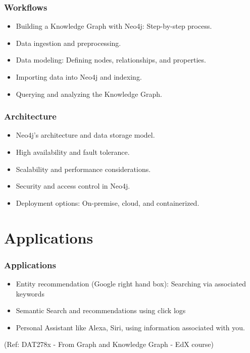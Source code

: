 \begin{frame}
  \frametitle{Workflows}
  \begin{itemize}
    \item Building a Knowledge Graph with Neo4j: Step-by-step process.
    \item Data ingestion and preprocessing.
    \item Data modeling: Defining nodes, relationships, and properties.
    \item Importing data into Neo4j and indexing.
    \item Querying and analyzing the Knowledge Graph.
  \end{itemize}
\end{frame}

\begin{frame}
  \frametitle{Architecture}
  \begin{itemize}
    \item Neo4j's architecture and data storage model.
    \item High availability and fault tolerance.
    \item Scalability and performance considerations.
    \item Security and access control in Neo4j.
    \item Deployment options: On-premise, cloud, and containerized.
  \end{itemize}
\end{frame}

\section{Applications}

\begin{frame}\frametitle{Applications}

\begin{itemize}
\item Entity recommendation (Google right hand box): Searching via associated keywords
\item Semantic Search and recommendations using click logs
\item Personal Assistant like Alexa, Siri, using information associated with you.
\end{itemize}

{\tiny (Ref: DAT278x - From Graph and Knowledge Graph - EdX course)}
\end{frame}


